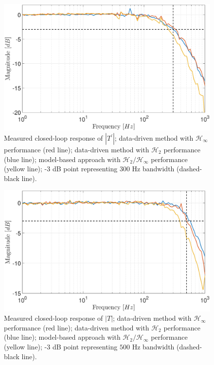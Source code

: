\documentclass[a4paper, 10pt, conference]{ieeeconf}
\begin{document}
\begin{figure}
\centering
\includegraphics[width=\columnwidth]{../pics/d_loop_mag.eps}
\caption{Measured closed-loop response of $|T^{\prime}|$; data-driven method with $\mathcal{H}_{\infty}$ performance (red line); data-driven method with $\mathcal{H}_2$ performance (blue line); model-based approach with $\mathcal{H}_2 / \mathcal{H}_\infty$ performance (yellow line); -3 dB point representing 300 Hz bandwidth (dashed-black line).}
\label{fig:d_loop}
\end{figure} 

\begin{figure}
\centering
\includegraphics[width=\columnwidth]{../pics/v_loop_mag.eps}
\caption{Measured closed-loop response of $|T|$; data-driven method with $\mathcal{H}_{\infty}$ performance (red line); data-driven method with $\mathcal{H}_2$ performance (blue line); model-based approach with $\mathcal{H}_2 / \mathcal{H}_\infty$ performance (yellow line); -3 dB point representing $500$ Hz bandwidth (dashed-black line).}
\label{fig:v_loop}
\end{figure} 
\end{document}
